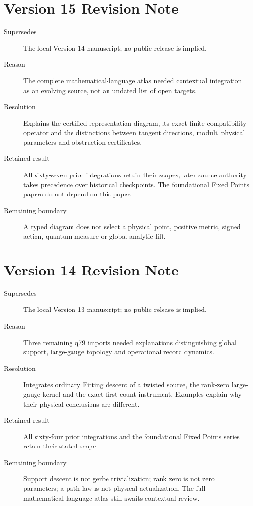\documentclass[11pt,a4paper]{article}
\begin{document}
\section*{Version 15 Revision Note}
\begin{description}
\item[Supersedes] The local Version 14 manuscript; no public release is implied.
\item[Reason] The complete mathematical-language atlas needed contextual
integration as an evolving source, not an undated list of open targets.
\item[Resolution] Explains the certified representation diagram, its exact
finite compatibility operator and the distinctions between tangent
directions, moduli, physical parameters and obstruction certificates.
\item[Retained result] All sixty-seven prior integrations retain their
scopes; later source authority takes precedence over historical checkpoints.
The foundational Fixed Points papers do not depend on this paper.
\item[Remaining boundary] A typed diagram does not select a physical
point, positive metric, signed action, quantum measure or global analytic lift.
\end{description}

\section*{Version 14 Revision Note}
\begin{description}
\item[Supersedes] The local Version 13 manuscript; no public release is implied.
\item[Reason] Three remaining q79 imports needed explanations distinguishing
global support, large-gauge topology and operational record dynamics.
\item[Resolution] Integrates ordinary Fitting descent of a twisted source,
the rank-zero large-gauge kernel and the exact first-count instrument.
Examples explain why their physical conclusions are different.
\item[Retained result] All sixty-four prior integrations and the
foundational Fixed Points series retain their stated scope.
\item[Remaining boundary] Support descent is not gerbe trivialization;
rank zero is not zero parameters; a path law is not physical actualization.
The full mathematical-language atlas still awaits contextual review.
\end{description}
\end{document}
